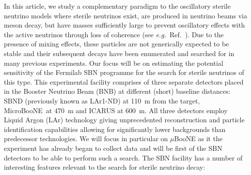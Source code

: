 \documentclass[11pt, a4paper]{article}
\newcommand{\refref}[1]{Ref.~\cite{#1}}
\def\eg{\emph{e.g.}}
\def\muboone{MicroBooNE}
\newcommand{\newtext}[2]{\textcolor{#1}{\ul{#2}}}
\begin{document}
In this article, we study a complementary paradigm to the oscillatory sterile
neutrino models where sterile neutrinos exist, are produced in neutrino beams
via meson decay, but have masses sufficiently large to prevent oscillatory
effects with the active neutrinos through loss of coherence (see \eg\
\refref{Akhmedov:2009rb}).  Due to the presence of mixing effects, these
particles are not generically expected to be stable and their subsequent decays
have been enumerated \cite{Atre:2009rg} and searched for in many previous
experiments.
%
Our focus will be on estimating the potential sensitivity of the Fermilab SBN
programme \cite{Antonello:2015lea} for the search for sterile neutrinos of this
type. 
%
This experimental facility comprises of three separate detectors placed in the
Booster Neutrino Beam (BNB) at different (short) baseline distances: SBND
(previously known as LAr1-ND) at 110~m from the target, \muboone\ at 470~m and
ICARUS at 600~m.  All three detectors employ Liquid Argon (LAr) technology
giving unprecedented reconstruction and particle identification capabilities
allowing for significantly lower backgrounds than predecessor technologies. We
will focus in particular on $\mu$BooNE as it the experiment has already began
to collect data and will be first of the SBN detectors to be able to perform
such a search.
%
%
The SBN facility has a number of interesting features relevant to the search
for sterile neutrino decay:
\end{document}
